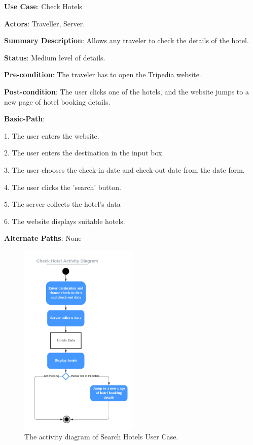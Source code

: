 \documentclass[conference]{IEEEtran}
\begin{document}
\textbf{ }

\textbf{Use Case}: Check Hotels

\textbf{Actors}: Traveller, Server.

\textbf{Summary Description}: Allows any traveler to check the details of the hotel.

\textbf{Status}: Medium level of details.

\textbf{Pre-condition}: The traveler has to open the Tripedia website.

\textbf{Post-condition}: The user clicks one of the hotels, and the website jumps to a new page of hotel booking details.

\textbf{Basic-Path}:

1. The user enters the website.

2. The user enters the destination in the input box.

3. The user chooses the check-in date and check-out date from the date form.

4. The user clicks the 'search' button.

5. The server collects the hotel's data

6. The website displays suitable hotels.

\textbf{Alternate Paths}: None


\begin{figure}[htbp]
	\centerline{\includegraphics[width=0.5\textwidth]{activity_diagram_hotel.pdf}}
	\caption{The activity diagram of Search Hotels User Case.}
	\label{fig9}
\end{figure}
\end{document}
